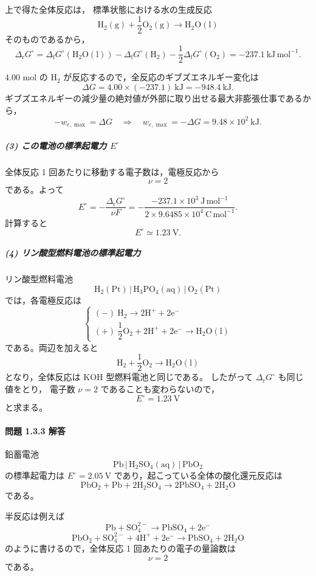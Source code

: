 \documentclass[a4paper,12pt]{jlreq}
\begin{document}
上で得た全体反応は，
標準状態における水の生成反応
\[
\mathrm{H_2(g) + \frac{1}{2}O_2(g) \rightarrow H_2O(l)}
\]
そのものであるから，
\[
\Delta_{\mathrm r}G^\circ
  = \Delta_{\mathrm f}G^\circ(\mathrm{H_2O(l)})
  - \Delta_{\mathrm f}G^\circ(\mathrm{H_2})
  - \frac{1}{2}\Delta_{\mathrm f}G^\circ(\mathrm{O_2})
  = -237.1\ \mathrm{kJ\,mol^{-1}}.
\]

4.00 mol の H$_2$ が反応するので，全反応のギブズエネルギー変化は
\[
\Delta G = 4.00\times(-237.1)\ \mathrm{kJ}
          = -948.4\ \mathrm{kJ}.
\]
ギブズエネルギーの減少量の絶対値が外部に取り出せる最大非膨張仕事であるから，
\[
-w_{e,\max} = \Delta G \quad\Rightarrow\quad
w_{e,\max} = -\Delta G = 9.48\times10^{2}\ \mathrm{kJ}.
\]

\subparagraph{(3) この電池の標準起電力 $E^\circ$}

全体反応 1 回あたりに移動する電子数は，電極反応から
\[
\nu = 2
\]
である。よって
\[
E^\circ
 = -\frac{\Delta_{\mathrm r}G^\circ}{\nu F}
 = -\frac{-237.1\times10^{3}\ \mathrm{J\,mol^{-1}}}
        {2\times 9.6485\times10^{4}\ \mathrm{C\,mol^{-1}}}.
\]
計算すると
\[
E^\circ \simeq 1.23\ \mathrm{V}.
\]

\subparagraph{(4) リン酸型燃料電池の標準起電力}

リン酸型燃料電池
\[
\mathrm{H_2(Pt)\,|\,H_3PO_4(aq)\,|\,O_2(Pt)}
\]
では，各電極反応は
\[
\begin{cases}
(-)\ \mathrm{H_2 \rightarrow 2H^+ + 2e^-} \\
(+)\ \dfrac{1}{2}\mathrm{O_2 + 2H^+ + 2e^- \rightarrow H_2O(l)}
\end{cases}
\]
である。両辺を加えると
\[
\mathrm{H_2 + \frac{1}{2}O_2 \rightarrow H_2O(l)}
\]
となり，全体反応は KOH 型燃料電池と同じである。
したがって $\Delta_{\mathrm r}G^\circ$ も同じ値をとり，
電子数 $\nu = 2$ であることも変わらないので，
\[
E^\circ = 1.23\ \mathrm{V}
\]
と求まる。

\paragraph{問題 1.3.3 解答}

鉛蓄電池
\[
\mathrm{Pb\,|\,H_2SO_4(aq)\,|\,PbO_2}
\]
の標準起電力は $E^\circ = 2.05\ \mathrm{V}$ であり，起こっている全体の酸化還元反応は
\[
\mathrm{PbO_2 + Pb + 2H_2SO_4 \rightarrow 2PbSO_4 + 2H_2O}
\]
である。

半反応は例えば
\[
\mathrm{Pb + SO_4^{2-} \rightarrow PbSO_4 + 2e^-}
\]
\[
\mathrm{PbO_2 + SO_4^{2-} + 4H^+ + 2e^- \rightarrow PbSO_4 + 2H_2O}
\]
のように書けるので，全体反応 1 回あたりの電子の量論数は
\[
\nu = 2
\]
である。
\end{document}
